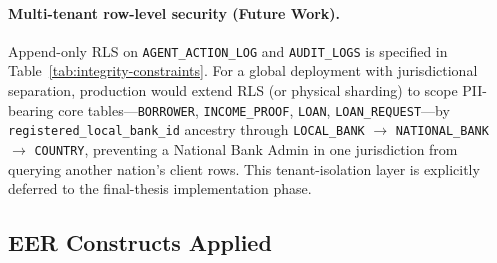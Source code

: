 \documentclass[12pt,a4paper]{report}
\begin{document}
\paragraph{Multi-tenant row-level security (Future Work).}
Append-only RLS on \texttt{AGENT\_ACTION\_LOG} and \texttt{AUDIT\_LOGS} is specified in Table~\ref{tab:integrity-constraints}. For a global deployment with jurisdictional separation, production would extend RLS (or physical sharding) to scope PII-bearing core tables---\texttt{BORROWER}, \texttt{INCOME\_PROOF}, \texttt{LOAN}, \texttt{LOAN\_REQUEST}---by \texttt{registered\_local\_bank\_id} ancestry through \texttt{LOCAL\_BANK} $\to$ \texttt{NATIONAL\_BANK} $\to$ \texttt{COUNTRY}, preventing a National Bank Admin in one jurisdiction from querying another nation's client rows. This tenant-isolation layer is explicitly deferred to the final-thesis implementation phase.

\subsection{EER Constructs Applied}
\end{document}
